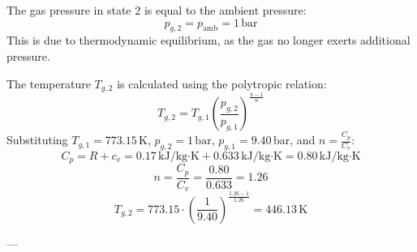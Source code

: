 The gas pressure in state 2 is equal to the ambient pressure:  
\[
p_{g,2} = p_{\text{amb}} = 1 \, \text{bar}
\]  
This is due to thermodynamic equilibrium, as the gas no longer exerts additional pressure.  

The temperature \( T_{g,2} \) is calculated using the polytropic relation:  
\[
T_{g,2} = T_{g,1} \left( \frac{p_{g,2}}{p_{g,1}} \right)^{\frac{n-1}{n}}
\]  
Substituting \( T_{g,1} = 773.15 \, \text{K} \), \( p_{g,2} = 1 \, \text{bar} \), \( p_{g,1} = 9.40 \, \text{bar} \), and \( n = \frac{C_p}{C_v} \):  
\[
C_p = R + c_v = 0.17 \, \text{kJ/kg·K} + 0.633 \, \text{kJ/kg·K} = 0.80 \, \text{kJ/kg·K}
\]  
\[
n = \frac{C_p}{C_v} = \frac{0.80}{0.633} = 1.26
\]  
\[
T_{g,2} = 773.15 \cdot \left( \frac{1}{9.40} \right)^{\frac{1.26 - 1}{1.26}} = 446.13 \, \text{K}
\]  

---
